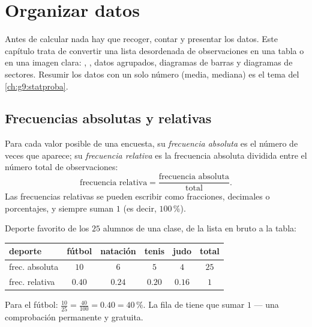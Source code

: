 \chapter{Organizar datos}\label{ch:g7:stats}

Antes de calcular nada hay que recoger, contar y presentar los
datos. Este capítulo trata de convertir una lista desordenada de observaciones
en una tabla o en una imagen clara: , , datos agrupados,
diagramas de barras y diagramas de sectores. Resumir los datos con un solo número (media,
mediana) es el tema del \cref{ch:g9:statproba}.

\section{Frecuencias absolutas y relativas}

\begin{definition}\label{def:g7:stats:frequency}
Para cada valor posible de una encuesta, su \emph{frecuencia absoluta} es
el número de veces que aparece; su \emph{frecuencia relativa}
es la frecuencia absoluta dividida entre el número total de observaciones:
\[
\text{frecuencia relativa} = \frac{\text{frecuencia absoluta}}{\text{total}} .
\]
Las frecuencias relativas se pueden escribir como fracciones, decimales o porcentajes, y
siempre suman $1$ (es decir, $100\,\%$).
\end{definition}

\begin{example}\label{ex:g7:stats:frequency}
Deporte favorito de los $25$ alumnos de una clase, de la lista en bruto a
la tabla:
\begin{center}
\renewcommand{\arraystretch}{1.3}
\begin{tabular}{l|cccc|c}
deporte & fútbol & natación & tenis & judo & total \\
\hline
frec. absoluta & $10$ & $6$ & $5$ & $4$ & $25$ \\
frec. relativa & $0.40$ & $0.24$ & $0.20$ & $0.16$ & $1$ \\
\end{tabular}
\end{center}
Para el fútbol: $\frac{10}{25} = \frac{40}{100} = 0.40 = 40\,\%$. La fila de
 tiene que sumar $1$ --- una comprobación permanente y gratuita.
\end{example}

